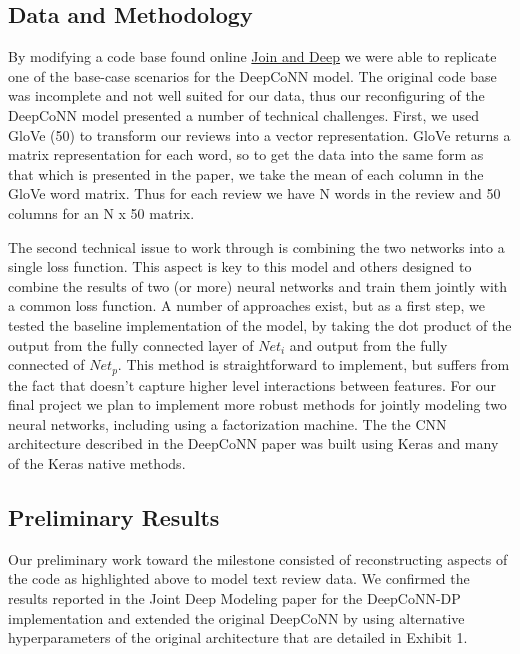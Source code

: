 \documentclass[10pt,twocolumn,letterpaper]{article}
\begin{document}
\subsection{Data and Methodology}

By modifying a code base found online \href{https://github.com/Praznat/uifud/tree/291b0882b02bf77edf9b310aeeb345784113b1f5}{Join and Deep} we were able to replicate one of the base-case scenarios for the DeepCoNN model. The original code base was incomplete and not well suited for our data, thus our reconfiguring of the DeepCoNN model presented a number of technical challenges. First, we used GloVe (50) to transform our reviews into a vector representation. GloVe returns a matrix representation for each word, so to get the data into the same form as that which is presented in the paper, we take the mean of each column in the GloVe word matrix. Thus for each review we have N words in the review and 50 columns for an N x 50 matrix.

The second technical issue to work through is combining the two networks into a single loss function. This aspect is key to this model and others designed to combine the results of two (or more) neural networks and train them jointly with a common loss function. A number of approaches exist, but as a first step, we tested the baseline implementation of the model, by taking the dot product of the output from the fully connected layer of $Net_{i}$ and output from the fully connected of $Net_{p}$. This method is straightforward to implement, but suffers from the fact that doesn't capture higher level interactions between features. For our final project we plan to implement more robust methods for jointly modeling two neural networks, including using a factorization machine. The the CNN architecture described in the DeepCoNN paper was built using Keras and many of the Keras native methods. 



\subsection{Preliminary Results}

Our preliminary work toward the milestone consisted of reconstructing aspects of the code as highlighted above to model text review data. We confirmed the results reported in the Joint Deep Modeling paper for the DeepCoNN-DP implementation and extended the original DeepCoNN by using alternative hyperparameters of the original architecture that are detailed in Exhibit 1. 
\end{document}
